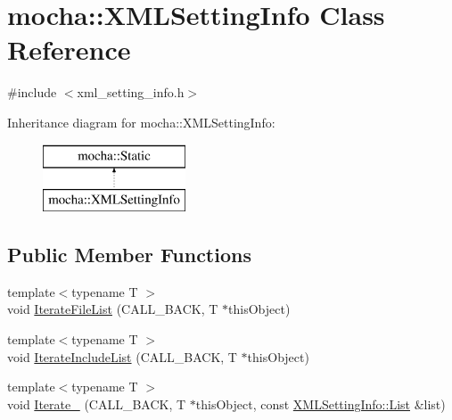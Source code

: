 \hypertarget{classmocha_1_1_x_m_l_setting_info}{
\section{mocha::XMLSettingInfo Class Reference}
\label{classmocha_1_1_x_m_l_setting_info}
}


{\ttfamily \#include $<$xml\_\-setting\_\-info.h$>$}

Inheritance diagram for mocha::XMLSettingInfo:\begin{figure}[H]
\begin{center}
\leavevmode
\includegraphics[height=2.000000cm]{classmocha_1_1_x_m_l_setting_info}
\end{center}
\end{figure}
\subsection*{Public Member Functions}
\begin{DoxyCompactItemize}
\item 
{\footnotesize template$<$typename T $>$ }\\void \hyperlink{classmocha_1_1_x_m_l_setting_info_a10b4908abb8c5eeb82778bf5421a3cc1}{IterateFileList} (CALL\_\-BACK, T $\ast$thisObject)
\item 
{\footnotesize template$<$typename T $>$ }\\void \hyperlink{classmocha_1_1_x_m_l_setting_info_a725dd423237c1cbb2fd51614f67c6ba8}{IterateIncludeList} (CALL\_\-BACK, T $\ast$thisObject)
\item 
{\footnotesize template$<$typename T $>$ }\\void \hyperlink{classmocha_1_1_x_m_l_setting_info_a8f804c8c8d08e0a9a3f2fb0c9f2c823c}{Iterate\_\-} (CALL\_\-BACK, T $\ast$thisObject, const \hyperlink{classmocha_1_1_x_m_l_setting_info_aaf66398a517745d0580193a8f89624f2}{XMLSettingInfo::List} \&list)
\end{DoxyCompactItemize}
